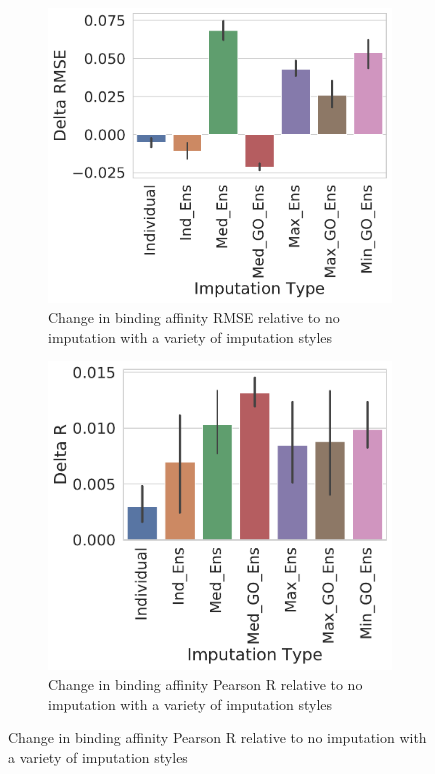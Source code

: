 \documentclass[journal=jmcmar,manuscript=article]{achemso}
\begin{document}
\begin{figure}[tbph]
    \centering
    \begin{subfigure}[t]{0.48\textwidth}
        \centering
        \includegraphics[width=\linewidth]{figures/ComparingImpStylesRMSE.pdf}
        \caption{Change in binding affinity RMSE relative to no imputation with a variety of imputation styles}
    \end{subfigure}
    \hfill
    \begin{subfigure}[t]{0.48\textwidth}
        \centering
        \includegraphics[width=\linewidth]{figures/ComparingImpStylesR.pdf}
        \caption{Change in binding affinity Pearson R relative to no imputation with a variety of imputation styles}
    \end{subfigure}


\end{figure}
\end{document}
